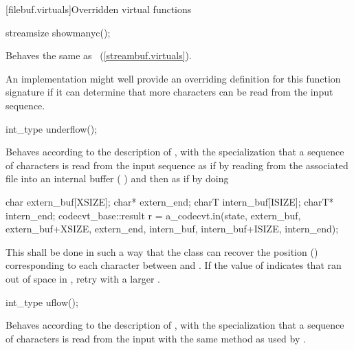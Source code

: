 [filebuf.virtuals]{Overridden virtual functions}

%
\begin{itemdecl}
streamsize showmanyc();
\end{itemdecl}

\begin{itemdescr}
\pnum
\effects
Behaves the same as
~(\ref{streambuf.virtuals}).
%

\pnum
\notes
An
implementation might well provide an overriding definition for this function
signature if it can determine that more characters can be read from the input
sequence.
\end{itemdescr}

%
\begin{itemdecl}
int_type underflow();
\end{itemdecl}

\begin{itemdescr}
\pnum
\effects
Behaves according to the description of
,
with the specialization that a sequence of characters is read from the input
sequence as if by reading from the associated file
into an internal buffer (
)
and then as if by doing

\begin{codeblock}
char   extern_buf[XSIZE];
char*  extern_end;
charT  intern_buf[ISIZE];
charT* intern_end;
codecvt_base::result r =
  a_codecvt.in(state, extern_buf, extern_buf+XSIZE, extern_end,
               intern_buf, intern_buf+ISIZE, intern_end);
\end{codeblock}

This shall be done in such a way that the class can recover the
position
()
corresponding to each character between
and
.
If the value of
indicates that
ran out of space in
,
retry with a larger
.
\end{itemdescr}

%
\begin{itemdecl}
int_type uflow();
\end{itemdecl}

\begin{itemdescr}
\pnum
\effects
Behaves according to the description of
,
with the specialization that a sequence of characters is read from the input
with the same method as used by
.
\end{itemdescr}

